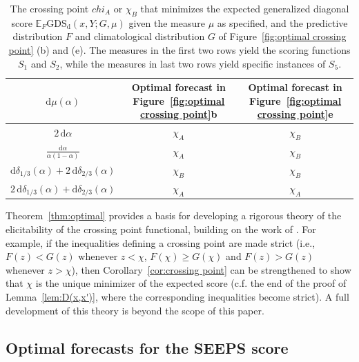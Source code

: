 \documentclass[10pt]{article} %
\theoremstyle{theorem}
\theoremstyle{definition}
\newcommand{\EEE}{\mathbb{E}}
\newcommand{\dd}{\mathrm{d}}
\newcommand{\ds}{\displaystyle}
\newcommand{\GDSd}{\mathrm{GDS}_\mathrm{d}}
\begin{document}
\begin{table}[t!]
    \renewcommand{\arraystretch}{1.5} %
    \centering \small
    \begin{tabular}{|c|c|c|}
    \hline
        $\dd\mu(\alpha)$ &  Optimal forecast in Figure~\ref{fig:optimal crossing point}b & Optimal forecast in Figure~\ref{fig:optimal crossing point}e \\ \hline
        $2\,\dd\alpha$ & $\chi_A$ & $\chi_B$ \\ 
        $\ds\frac{\dd\alpha}{\alpha(1-\alpha)}$ & $\chi_A$ & $\chi_B$  \\ 
        $\dd\delta_{1/3}(\alpha)+2\,\dd\delta_{2/3}(\alpha)$ & $\chi_B$ & $\chi_B$ \\ 
        $2\,\dd\delta_{1/3}(\alpha)+\dd\delta_{2/3}(\alpha)$ & $\chi_A$ & $\chi_A$ \\	\hline
    \end{tabular}
    \caption{The crossing point $chi_A$ or $\chi_B$ that minimizes the expected generalized diagonal score $\EEE_F\GDSd(x,Y;G,\mu)$ given the measure $\mu$ as specified, and the predictive distribution $F$ and climatological distribution $G$ of Figure~\ref{fig:optimal crossing point} (b) and (e). The measures in the first two rows yield the scoring functions $S_1$ and $S_2$, while the measures in last two rows yield specific instances of $S_5$.}
    \label{tab:optimal depends on measure}
\end{table}

Theorem~\ref{thm:optimal} provides a basis for developing a rigorous theory of the elicitability \citep[Definition~2]{gneiting2011making} of the crossing point functional, building on the work of \citet{ben2021verification}. For example, if the inequalities defining a crossing point are made strict (i.e., $F(z)<G(z)$ whenever $z<\chi$, $F(\chi)\geq G(\chi)$ and $F(z)>G(z)$ whenever $z>\chi$), then Corollary~\ref{cor:crossing point} can be strengthened to show that $\chi$ is the unique minimizer of the expected score (c.f. the end of the proof of Lemma~\ref{lem:D(x,x')}, where the corresponding inequalities become strict). A full development of this theory is beyond the scope of this paper.

\subsection{Optimal forecasts for the SEEPS score}\label{ss:SEEPS optimization}
\end{document}
